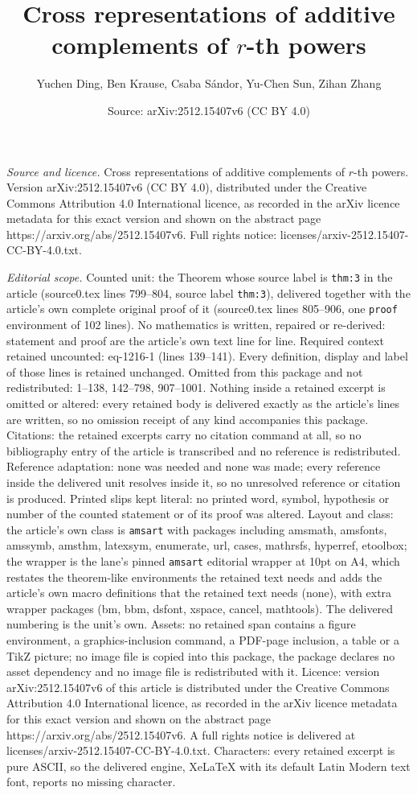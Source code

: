 \documentclass[10pt,a4paper]{amsart}
\title[Cross representations of additive complements of $r$-th powe]{Cross representations of additive complements of $r$-th powers}
\author{Yuchen Ding, Ben Krause, Csaba S\'andor, Yu-Chen Sun, Zihan Zhang}
\date{Source: arXiv:2512.15407v6 (CC BY 4.0)}
\begin{document}
\maketitle

\noindent\emph{Source and licence.} Cross representations of additive complements of $r$-th powers. Version arXiv:2512.15407v6 (CC BY 4.0), distributed under the Creative Commons Attribution 4.0 International licence, as recorded in the arXiv licence metadata for this exact version and shown on the abstract page https://arxiv.org/abs/2512.15407v6. Full rights notice: licenses/arxiv-2512.15407-CC-BY-4.0.txt.\par\smallskip

\noindent\textit{Editorial scope.} Counted unit: the Theorem whose source label is \texttt{thm:3} in the article (source0.tex lines 799--804, source label \texttt{thm:3}), delivered together with the article's own complete original proof of it (source0.tex lines 805--906, one \texttt{proof} environment of 102 lines). No mathematics is written, repaired or re-derived: statement and proof are the article's own text line for line. Required context retained uncounted: eq-1216-1 (lines 139--141). Every definition, display and label of those lines is retained unchanged. Omitted from this package and not redistributed: 1--138, 142--798, 907--1001. Nothing inside a retained excerpt is omitted or altered: every retained body is delivered exactly as the article's lines are written, so no omission receipt of any kind accompanies this package. Citations: the retained excerpts carry no citation command at all, so no bibliography entry of the article is transcribed and no reference is redistributed. Reference adaptation: none was needed and none was made; every reference inside the delivered unit resolves inside it, so no unresolved reference or citation is produced. Printed slips kept literal: no printed word, symbol, hypothesis or number of the counted statement or of its proof was altered. Layout and class: the article's own class is \texttt{amsart} with packages including amsmath, amsfonts, amssymb, amsthm, latexsym, enumerate, url, cases, mathrsfs, hyperref, etoolbox; the wrapper is the lane's pinned \texttt{amsart} editorial wrapper at 10pt on A4, which restates the theorem-like environments the retained text needs and adds the article's own macro definitions that the retained text needs (none), with extra wrapper packages (bm, bbm, dsfont, xspace, cancel, mathtools). The delivered numbering is the unit's own. Assets: no retained span contains a figure environment, a graphics-inclusion command, a PDF-page inclusion, a table or a TikZ picture; no image file is copied into this package, the package declares no asset dependency and no image file is redistributed with it. Licence: version arXiv:2512.15407v6 of this article is distributed under the Creative Commons Attribution 4.0 International licence, as recorded in the arXiv licence metadata for this exact version and shown on the abstract page https://arxiv.org/abs/2512.15407v6. A full rights notice is delivered at licenses/arxiv-2512.15407-CC-BY-4.0.txt. Characters: every retained excerpt is pure ASCII, so the delivered engine, XeLaTeX with its default Latin Modern text font, reports no missing character.
\end{document}
